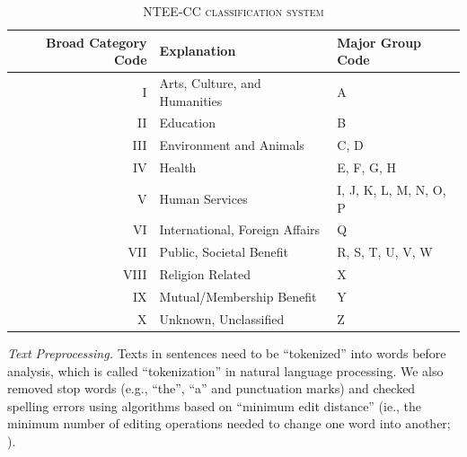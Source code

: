 \documentclass[11pt]{article}
\begin{document}
\begin{table}[]
    \centering
    \begin{tabularx}{\textwidth}{r|X|X}
    	 \hline
         Broad Category Code & Explanation & Major Group Code \\
         \hline
		I & Arts, Culture, and Humanities & A \\
		II & Education & B \\
		III & Environment and Animals & C, D \\
		IV & Health & E, F, G, H \\
		V & Human Services & I, J, K, L, M, N, O, P \\
		VI & International, Foreign Affairs & Q \\
		VII & Public, Societal Benefit & R, S, T, U, V, W \\
		VIII & Religion Related & X \\
		IX & Mutual/Membership Benefit & Y \\
		X & Unknown, Unclassified & Z \\
         \hline
    \end{tabularx}
    \caption{\textsc{NTEE-CC classification system}} \label{tab:classification}
    \label{tab:my_label}
\end{table}


\textit{Text Preprocessing.} Texts in sentences need to be ``tokenized'' into words before analysis, which is called ``tokenization'' in natural language processing. We also removed stop words (e.g., ``the'', ``a'' and punctuation marks) and checked spelling errors using algorithms based on ``minimum edit distance'' (ie., the minimum number of editing operations needed to change one word into another; \textcite[26]{JurafskySpeechLanguageProcessing2017}).


\end{document}
